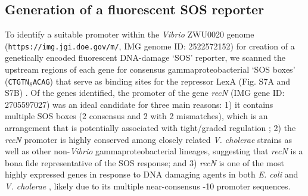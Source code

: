 \subsection*{Generation of a fluorescent SOS reporter}
To identify a suitable promoter within the \textit{Vibrio} ZWU0020 genome (\texttt{https://img.jgi.doe.gov/m/}, IMG genome ID: 2522572152) for creation of a genetically encoded fluorescent DNA-damage `SOS' reporter, we scanned the upstream regions of each gene for consensus gammaproteobacterial `SOS boxes' (\texttt{CTGTN$_8$ACAG}) that serve as binding sites for the repressor LexA (Fig. S7A and S7B) \cite{erill2007aeons}. Of the genes identified, the promoter of the gene \textit{recN} (IMG gene ID: 2705597027) was an ideal candidate for three main reasons: 1) it contains multiple SOS boxes (2 consensus and 2 with 2 mismatches), which is an arrangement that is potentially associated with tight/graded regulation \cite{kreuzer2013dna}; 2) the \textit{recN} promoter is highly conserved among closely related \textit{V. cholerae} strains as well as other non-\textit{Vibrio} gammaproteobacterial lineages, suggesting that \textit{recN} is a bona fide representative of the SOS response; and 3) \textit{recN} is one of the most highly expressed genes in response to DNA damaging agents in both \textit{E. coli} and \textit{V. cholerae} \cite{courcelle2001comparative,Krin2018}, likely due to its multiple near-consensus -10 promoter sequences.

